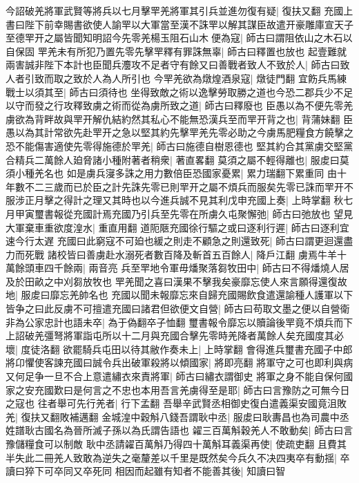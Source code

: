 今詔破羌將軍武賢等將兵以七月擊䍐羌將軍其引兵並進勿復有疑|{
	復扶又翻}
充國上書曰陛下前幸賜書欲使人諭䍐以大軍當至漢不誅䍐以解其謀臣故遣开豪雕庫宣天子至德䍐开之屬皆聞知明詔今先零羌楊玉阻石山木便為寇|{
	師古曰謂阻依山之木石以自保固}
䍐羌未有所犯乃置先零先擊䍐釋有罪誅無辜|{
	師古曰釋置也放也}
起壹難就兩害誠非陛下本計也臣聞兵灋攻不足者守有餘又曰善戰者致人不致於人|{
	師古曰致人者引致而取之致於人為人所引也}
今䍐羌欲為燉煌酒泉寇|{
	燉徒門翻}
宜飭兵馬練戰士以須其至|{
	師古曰須待也}
坐得致敵之術以逸擊勞取勝之道也今恐二郡兵少不足以守而發之行攻釋致虜之術而從為虜所致之道|{
	師古曰釋廢也}
臣愚以為不便先零羌虜欲為背畔故與䍐开解仇結約然其私心不能無恐漢兵至而䍐开背之也|{
	背蒲妹翻}
臣愚以為其計常欲先赴䍐开之急以堅其約先擊䍐羌先零必助之今虜馬肥糧食方饒擊之恐不能傷害適使先零得施德於䍐羌|{
	師古曰施德自樹恩德也}
堅其約合其黨虜交堅黨合精兵二萬餘人廹脅諸小種附著者稍衆|{
	著直畧翻}
莫須之屬不輕得離也|{
	服䖍曰莫須小種羌名也}
如是虜兵寖多誅之用力數倍臣恐國家憂累|{
	累力瑞翻下累重同}
由十年數不二三歲而已於臣之計先誅先零已則䍐开之屬不煩兵而服矣先零已誅而䍐开不服涉正月擊之得計之理又其時也以今進兵誠不見其利戊申充國上奏|{
	上時掌翻}
秋七月甲寅璽書報從充國計焉充國乃引兵至先零在所虜久屯聚懈弛|{
	師古曰弛放也}
望見大軍棄車重欲度湟水|{
	重直用翻}
道阨陿充國徐行驅之或曰逐利行遲|{
	師古曰逐利宜速今行太遅}
充國曰此窮寇不可廹也緩之則走不顧急之則還致死|{
	師古曰謂更迴還盡力而死戰}
諸校皆曰善虜赴水溺死者數百降及斬首五百餘人|{
	降戶江翻}
虜焉牛羊十萬餘頭車四千餘兩|{
	兩音亮}
兵至䍐地令軍毋燔聚落芻牧田中|{
	師古曰不得燔燒人居及於田畝之中刈芻放牧也}
䍐羌聞之喜曰漢果不擊我矣豪靡忘使人來言願得還復故地|{
	服䖍曰靡忘羌帥名也}
充國以聞未報靡忘來自歸充國賜飲食遣還諭種人護軍以下皆争之曰此反虜不可擅遣充國曰諸君但欲便文自營|{
	師古曰苟取文墨之便以自營衛}
非為公家忠計也語未卒|{
	為于偽翻卒子恤翻}
璽書報令靡忘以贖論後䍐竟不煩兵而下上詔破羌彊弩將軍詣屯所以十二月與充國合擊先零時羌降者萬餘人矣充國度其必壞|{
	度徒洛翻}
欲罷騎兵屯田以待其敝作奏未上|{
	上時掌翻}
會得進兵璽書充國子中郎將卬懼使客諫充國曰誠令兵出破軍殺將以傾國家|{
	將即亮翻}
將軍守之可也即利與病又何足争一旦不合上意遣繡衣來責將軍|{
	師古曰繡衣謂御史}
將軍之身不能自保何國家之安充國歎曰是何言之不忠也本用吾言羌虜得至是耶|{
	師古曰言豫防之可無今日之寇也}
往者舉可先行羌者|{
	行下孟翻}
吾舉辛武賢丞相御史復白遣義渠安國竟沮敗羌|{
	復扶又翻敗補邁翻}
金城湟中穀斛八錢吾謂耿中丞|{
	服䖍曰耿夀昌也為司農中丞姓譜耿古國名為晉所滅子孫以為氏謂告語也}
糴三百萬斛穀羌人不敢動矣|{
	師古曰言豫儲糧食可以制敵}
耿中丞請糴百萬斛乃得四十萬斛耳義渠再使|{
	使疏吏翻}
且費其半失此二冊羌人致敢為逆失之毫釐差以千里是既然矣今兵久不决四夷卒有動揺|{
	卒讀曰猝下可卒同又卒死同}
相因而起雖有知者不能善其後|{
	知讀曰智}
